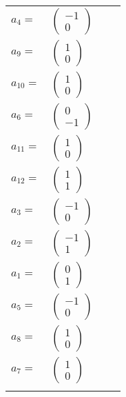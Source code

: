 \documentclass[1p]{elsarticle_modified}
\theoremstyle{definition}
\begin{document}
\begin{tabular}{m{7pt} m{180pt} m{7pt} m{180pt} }
\flushright $a_{4}=$&$\begin{pmatrix}-1\\0\end{pmatrix}$ \\
\flushright $a_{9}=$&$\begin{pmatrix}1\\0\end{pmatrix}$ \\
\flushright $a_{10}=$&$\begin{pmatrix}1\\0\end{pmatrix}$ \\
\flushright $a_{6}=$&$\begin{pmatrix}0\\-1\end{pmatrix}$ \\
\flushright $a_{11}=$&$\begin{pmatrix}1\\0\end{pmatrix}$ \\
\flushright $a_{12}=$&$\begin{pmatrix}1\\1\end{pmatrix}$ \\
\flushright $a_{3}=$&$\begin{pmatrix}-1\\0\end{pmatrix}$ \\
\flushright $a_{2}=$&$\begin{pmatrix}-1\\1\end{pmatrix}$ \\
\flushright $a_{1}=$&$\begin{pmatrix}0\\1\end{pmatrix}$ \\
\flushright $a_{5}=$&$\begin{pmatrix}-1\\0\end{pmatrix}$ \\
\flushright $a_{8}=$&$\begin{pmatrix}1\\0\end{pmatrix}$ \\
\flushright $a_{7}=$&$\begin{pmatrix}1\\0\end{pmatrix}$\\&\end{tabular}
\end{document}
